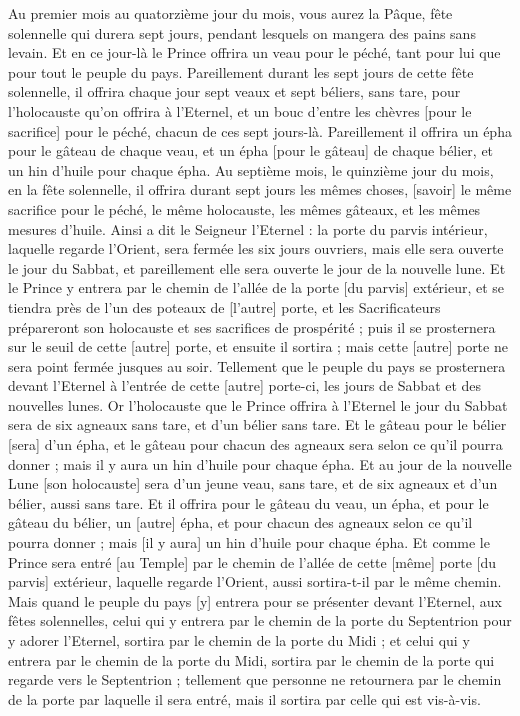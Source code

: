 \begin{multicols}{2}
Au premier mois au quatorzième jour du mois, vous aurez la Pâque, fête solennelle qui durera sept jours, pendant lesquels on mangera des pains sans levain.
Et en ce jour-là le Prince offrira un veau pour le péché, tant pour lui que pour tout le peuple du pays.
Pareillement durant les sept jours de cette fête solennelle, il offrira chaque jour sept veaux et sept béliers, sans tare, pour l'holocauste qu'on offrira à l'Eternel, et un bouc d'entre les chèvres [pour le sacrifice] pour le péché, chacun de ces sept jours-là.
Pareillement il offrira un épha pour le gâteau de chaque veau, et un épha [pour le gâteau] de chaque bélier, et un hin d'huile pour chaque épha.
Au septième mois, le quinzième jour du mois, en la fête solennelle, il offrira durant sept jours les mêmes choses, [savoir] le même sacrifice pour le péché, le même holocauste, les mêmes gâteaux, et les mêmes mesures d'huile.
\VerseOne{}Ainsi a dit le Seigneur l'Eternel : la porte du parvis intérieur, laquelle regarde l'Orient, sera fermée les six jours ouvriers, mais elle sera ouverte le jour du Sabbat, et pareillement elle sera ouverte le jour de la nouvelle lune.
Et le Prince y entrera par le chemin de l'allée de la porte [du parvis] extérieur, et se tiendra près de l'un des poteaux de [l'autre] porte, et les Sacrificateurs prépareront son holocauste et ses sacrifices de prospérité ; puis il se prosternera sur le seuil de cette [autre] porte, et ensuite il sortira ; mais cette [autre] porte ne sera point fermée jusques au soir.
Tellement que le peuple du pays se prosternera devant l'Eternel à l'entrée de cette [autre] porte-ci, les jours de Sabbat et des nouvelles lunes.
Or l'holocauste que le Prince offrira à l'Eternel le jour du Sabbat sera de six agneaux sans tare, et d'un bélier sans tare.
Et le gâteau pour le bélier [sera] d'un épha, et le gâteau pour chacun des agneaux sera selon ce qu'il pourra donner ; mais il y aura un hin d'huile pour chaque épha.
Et au jour de la nouvelle Lune [son holocauste] sera d'un jeune veau, sans tare, et de six agneaux et d'un bélier, aussi sans tare.
Et il offrira pour le gâteau du veau, un épha, et pour le gâteau du bélier, un [autre] épha, et pour chacun des agneaux selon ce qu'il pourra donner ; mais [il y aura] un hin d'huile pour chaque épha.
Et comme le Prince sera entré [au Temple] par le chemin de l'allée de cette [même] porte [du parvis] extérieur, laquelle regarde l'Orient, aussi sortira-t-il par le même chemin.
Mais quand le peuple du pays [y] entrera pour se présenter devant l'Eternel, aux fêtes solennelles, celui qui y entrera par le chemin de la porte du Septentrion pour y adorer l'Eternel, sortira par le chemin de la porte du Midi ; et celui qui y entrera par le chemin de la porte du Midi, sortira par le chemin de la porte qui regarde vers le Septentrion ; tellement que personne ne retournera par le chemin de la porte par laquelle il sera entré, mais il sortira par celle qui est vis-à-vis.

\end{multicols}
